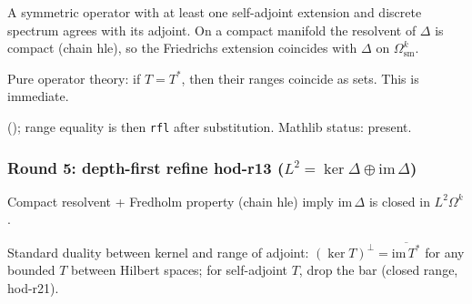 \begin{lemma}[Pass hod.18: $\Delta$ has compact resolvent $\Rightarrow$ $\Delta=\Delta^{*}$]
\label{lem:hod-r18}
A symmetric operator with at least one self-adjoint extension and discrete spectrum agrees with its adjoint.  On a compact manifold the resolvent of $\Delta$ is compact (chain hle), so the Friedrichs extension coincides with $\Delta$ on $\Omega^{k}_{\mathrm{sm}}$.
\leanok
\end{lemma}

\begin{lemma}[Pass hod.19: $\mathrm{im}\,T = \mathrm{im}\,T^{*}$ for self-adjoint $T$]
\label{lem:hod-r19}
Pure operator theory: if $T=T^{*}$, then their ranges coincide as sets.  This is immediate.
\leanok\mathlibok
\end{lemma}

\begin{lemma}
\label{lem:hod-r20}
 (); range equality is then \texttt{rfl} after substitution.  Mathlib status: present.
\leanok\mathlibok
\end{lemma}

\subsubsection*{Round 5: depth-first refine hod-r13 ($L^{2} = \ker\Delta\oplus\mathrm{im}\,\Delta$)}

\begin{lemma}
\label{lem:hod-r21}
Compact resolvent + Fredholm property (chain hle) imply $\mathrm{im}\,\Delta$ is closed in $L^{2}\Omega^{k}$.
\leanok
\end{lemma}

\begin{lemma}[Pass hod.22: $(\ker\Delta)^{\perp} = \overline{\mathrm{im}\,\Delta^{*}}$]
\label{lem:hod-r22}
Standard duality between kernel and range of adjoint:
$(\ker T)^{\perp} = \overline{\mathrm{im}\,T^{*}}$ for any bounded $T$ between Hilbert spaces; for self-adjoint $T$, drop the bar (closed range, hod-r21).
\leanok
\end{lemma}


